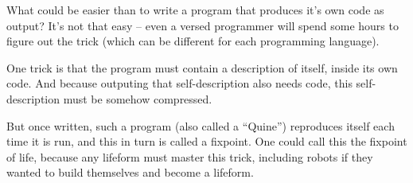 
What could be easier than to write a program that produces it's own
code as output? It's not that easy -- even a versed programmer will
spend some hours to figure out the trick (which can be different for each
programming language).

One trick is that the program must contain a description of itself,
inside its own code. And because outputing that self-description also
needs code, this self-description must be somehow compressed.

But once written, such a program (also called a ``Quine'') reproduces
itself each time it is run, and this in turn is called a fixpoint.
One could call this the fixpoint of life, because any lifeform must
master this trick, including robots if they wanted to build themselves
and become a lifeform.

